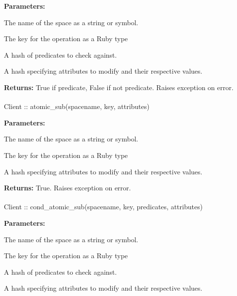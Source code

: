 \noindent\textbf{Parameters:}
\begin{description}[labelindent=\widthof{{\code{predicates}}},leftmargin=*,noitemsep,nolistsep,align=right]
\item[\code{spacename}] The name of the space as a string or symbol.
\item[\code{key}] The key for the operation as a Ruby type
\item[\code{predicates}] A hash of predicates to check against.
\item[\code{attributes}] A hash specifying attributes to modify and their respective values.
\end{description}

\noindent\textbf{Returns:}
True if predicate, False if not predicate.  Raises exception on error.

\paragraph{}
\begin{ccode}
Client :: atomic_sub(spacename, key, attributes)
\end{ccode}
\funcdesc 

\noindent\textbf{Parameters:}
\begin{description}[labelindent=\widthof{{\code{attributes}}},leftmargin=*,noitemsep,nolistsep,align=right]
\item[\code{spacename}] The name of the space as a string or symbol.
\item[\code{key}] The key for the operation as a Ruby type
\item[\code{attributes}] A hash specifying attributes to modify and their respective values.
\end{description}

\noindent\textbf{Returns:}
True.  Raises exception on error.

\paragraph{}
\begin{ccode}
Client :: cond_atomic_sub(spacename, key, predicates, attributes)
\end{ccode}
\funcdesc 

\noindent\textbf{Parameters:}
\begin{description}[labelindent=\widthof{{\code{predicates}}},leftmargin=*,noitemsep,nolistsep,align=right]
\item[\code{spacename}] The name of the space as a string or symbol.
\item[\code{key}] The key for the operation as a Ruby type
\item[\code{predicates}] A hash of predicates to check against.
\item[\code{attributes}] A hash specifying attributes to modify and their respective values.
\end{description}

